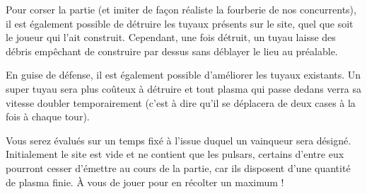 Pour corser la partie (et imiter de façon réaliste la fourberie de nos
concurrents), il est également possible de détruire les tuyaux présents sur le
site, quel que soit le joueur qui l'ait construit. Cependant, une fois détruit,
un tuyau laisse des débris empêchant de construire par dessus sans déblayer le
lieu au préalable.

En guise de défense, il est également possible d'améliorer les tuyaux
existants. Un super tuyau sera plus coûteux à détruire et tout plasma qui passe
dedans verra sa vitesse doubler temporairement (c'est à dire qu'il se déplacera
de deux cases à la fois à chaque tour).

Vous serez évalués sur un temps fixé à l'issue duquel un vainqueur sera
désigné. Initialement le site est vide et ne contient que les pulsars, certains
d'entre eux pourront cesser d'émettre au cours de la partie, car ils disposent
d'une quantité de plasma finie. À vous de jouer pour en récolter un maximum !
